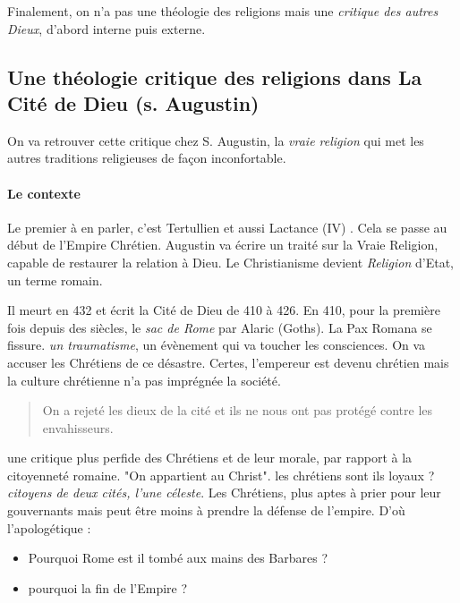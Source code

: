 Finalement, on n'a pas une théologie des religions mais une \textit{critique des autres Dieux}, d'abord interne puis externe.
 
 \subsection{Une théologie critique des religions dans La Cité de Dieu (s. Augustin)}
 
 On va retrouver cette critique chez S. Augustin, la \textit{vraie religion} qui met les autres traditions religieuses de façon inconfortable.
 
\paragraph{Le contexte} Le premier à en parler, c'est Tertullien et aussi Lactance (IV) . Cela se passe au début de l'Empire Chrétien.  Augustin va écrire un traité sur la Vraie Religion, capable de restaurer la relation à Dieu. 
Le Christianisme devient \textit{Religion} d'Etat, un terme romain. 

Il meurt en 432 et écrit la Cité de Dieu de 410 à 426. En 410, pour la première fois depuis des siècles, le \textit{sac de Rome} par Alaric (Goths). La Pax Romana se fissure. \textit{un traumatisme}, un évènement qui va toucher les consciences. On va accuser les Chrétiens de ce désastre. Certes, l'empereur est devenu chrétien mais la culture chrétienne n'a pas imprégnée la société. 
\begin{quote}
    On a rejeté les dieux de la cité et ils ne nous ont pas protégé contre les envahisseurs. 
\end{quote}
une critique plus perfide des Chrétiens et de leur morale, par rapport à la citoyenneté romaine. "On appartient au Christ". les chrétiens sont ils loyaux ? \textit{citoyens de deux cités, l'une céleste}. Les Chrétiens, plus aptes à prier pour leur gouvernants mais peut être moins à prendre la défense de l'empire.
D'où l'apologétique : 
\begin{itemize}
    \item Pourquoi Rome est il tombé aux mains des Barbares ?
    \item pourquoi la fin de l'Empire ?
\end{itemize}

